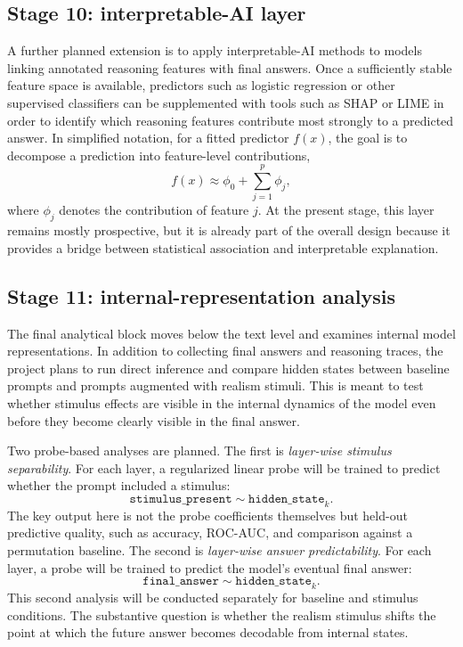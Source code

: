 \documentclass[14pt,a4paper]{extarticle}
\begin{document}
\subsection{Stage 10: interpretable-AI layer}

A further planned extension is to apply interpretable-AI methods to models linking annotated reasoning features with final answers. Once a sufficiently stable feature space is available, predictors such as logistic regression or other supervised classifiers can be supplemented with tools such as SHAP or LIME in order to identify which reasoning features contribute most strongly to a predicted answer. In simplified notation, for a fitted predictor \(f(x)\), the goal is to decompose a prediction into feature-level contributions,
\[
f(x) \approx \phi_0 + \sum_{j=1}^{p}\phi_j,
\]
where \(\phi_j\) denotes the contribution of feature \(j\). At the present stage, this layer remains mostly prospective, but it is already part of the overall design because it provides a bridge between statistical association and interpretable explanation.

\subsection{Stage 11: internal-representation analysis}

The final analytical block moves below the text level and examines internal model representations. In addition to collecting final answers and reasoning traces, the project plans to run direct inference and compare hidden states between baseline prompts and prompts augmented with realism stimuli. This is meant to test whether stimulus effects are visible in the internal dynamics of the model even before they become clearly visible in the final answer.

Two probe-based analyses are planned. The first is \emph{layer-wise stimulus separability}. For each layer, a regularized linear probe will be trained to predict whether the prompt included a stimulus:
\[
\texttt{stimulus\_present} \sim \texttt{hidden\_state}_{k}.
\]
The key output here is not the probe coefficients themselves but held-out predictive quality, such as accuracy, ROC-AUC, and comparison against a permutation baseline. The second is \emph{layer-wise answer predictability}. For each layer, a probe will be trained to predict the model's eventual final answer:
\[
\texttt{final\_answer} \sim \texttt{hidden\_state}_{k}.
\]
This second analysis will be conducted separately for baseline and stimulus conditions. The substantive question is whether the realism stimulus shifts the point at which the future answer becomes decodable from internal states.
\end{document}
